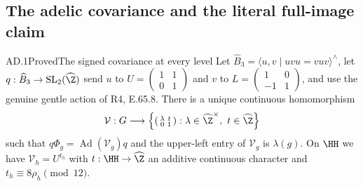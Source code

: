 \subsection{The adelic covariance and the literal full-image claim}

\begin{statement}{AD.1}{Proved}{The signed covariance at every level}
Let $\widehat B_3=\langle u,v\mid uvu=vuv\rangle^{\wedge}$,
let $q:\widehat B_3\to\mathrm{SL}_2(\widehat\Z)$ send
$u$ to $U=\left(\begin{smallmatrix}1&1\\0&1\end{smallmatrix}\right)$
and $v$ to $L=\left(\begin{smallmatrix}1&0\\-1&1\end{smallmatrix}\right)$,
and use the genuine gentle action of R4, E.65.8. There is a unique
continuous homomorphism
\[
 \mathcal V:G\longrightarrow
 \left\{\left(\begin{smallmatrix}\lambda&t\\0&1\end{smallmatrix}\right):
       \lambda\in\widehat\Z^{\times},\ t\in\widehat\Z\right\}
\]
such that $q\Phi_g=\operatorname{Ad}(\mathcal V_g)q$ and
the upper-left entry of $\mathcal V_g$ is $\lambda(g)$.
On $\HH$ we have $\mathcal V_h=U^{t_h}$ with
$t:\HH\to\widehat\Z$ an additive continuous character and
$t_h\equiv8\rho_h\pmod{12}$.
\end{statement}
